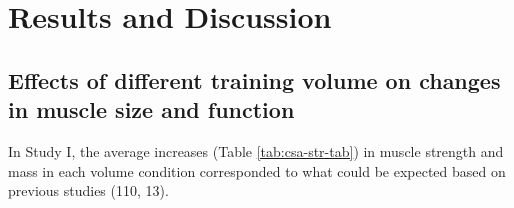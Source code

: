 \documentclass[twoside,10pt]{gihclass} %
\begin{document}
\hypertarget{results-and-discussion}{%
\chapter{Results and Discussion}\label{results-and-discussion}}

\hypertarget{effects-of-different-training-volume-on-changes-in-muscle-size-and-function}{%
\section{Effects of different training volume on changes in muscle size and function}\label{effects-of-different-training-volume-on-changes-in-muscle-size-and-function}}

In Study I, the average increases (Table \ref{tab:csa-str-tab}) in muscle strength and mass in each volume condition corresponded to what could be expected based on previous studies
(110, 13).
\end{document}
